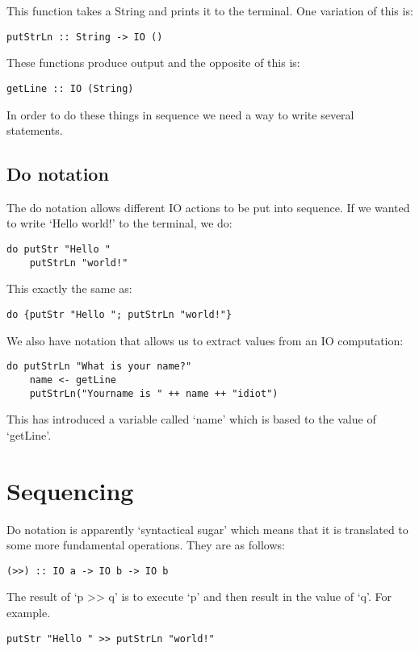 \documentclass[11pt,a4paper,titlepage,dvipsnames,cmyk]{scrartcl}
\begin{document}
This function takes a String and prints it to the terminal. One variation
of this is:
\begin{lstlisting}[style=B]
putStrLn :: String -> IO ()
\end{lstlisting}
These functions produce output and the opposite of this is:
\begin{lstlisting}[style=B]
getLine :: IO (String)
\end{lstlisting}

In order to do these things in sequence we need a way to write several
statements.
\subsection{Do notation}%
\label{sub:do}

The do notation allows different IO actions to be put into sequence. If we
wanted to write `Hello world!' to the terminal, we do:
\begin{lstlisting}[style=B]
do putStr "Hello "
    putStrLn "world!"
\end{lstlisting}
This exactly the same as:
\begin{lstlisting}[style=B]
do {putStr "Hello "; putStrLn "world!"}
\end{lstlisting}

We also have notation that allows us to extract values from an IO
computation:
\begin{lstlisting}[style=B]
do putStrLn "What is your name?"
    name <- getLine
    putStrLn("Yourname is " ++ name ++ "idiot")
\end{lstlisting}

This has introduced a variable called `name' which is based to the value
of `getLine'.

\section{Sequencing}%
\label{sec:Sequencing}
Do notation is apparently `syntactical sugar' which means that it is
translated to some more fundamental operations. They are as follows:
\begin{lstlisting}[style=B]
(>>) :: IO a -> IO b -> IO b
\end{lstlisting}
The result of `p >> q' is to execute `p' and then result in the value of
`q'. For example.
\begin{lstlisting}[style=B]
putStr "Hello " >> putStrLn "world!"
\end{lstlisting}
\end{document}
